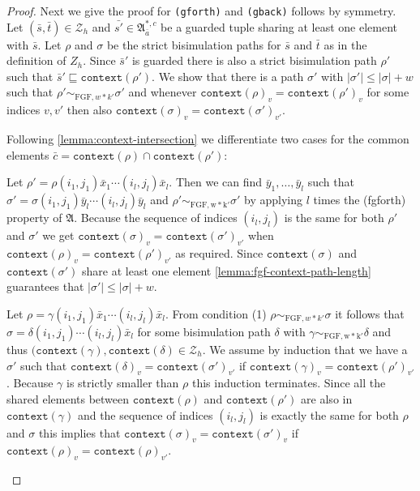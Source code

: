 \documentclass[draft]{scrartcl}
\theoremstyle{definition}
\newcommand{\context}[1]{\mathtt{context}(#1)}
\begin{document}
\begin{proof}
  Next we give the proof for \texttt{(gforth)} and \texttt{(gback)} follows by symmetry.
  Let $(\bar{s}, \bar{t}) \in \mathcal{Z}_{h}$ and $\bar{s'} \in \mathfrak{A}^{*,c}_{\bar{a}}$ be a guarded tuple sharing at least one element with $\bar{s}$.
  Let $\rho$ and $\sigma$ be the strict bisimulation paths for $\bar{s}$ and $\bar{t}$ as in the definition of $Z_{h}$.
  Since $\bar{s}'$ is guarded there is also a strict bisimulation path $\rho'$ such that $\bar{s}' \sqsubseteq \context{\rho'}$.
  We show that there is a path $\sigma'$ with $|\sigma'| \le |\sigma| + w$ such that $\rho' \sim_{\textrm{FGF}, w*k'} \sigma'$ and whenever $\context{\rho}_{v} = \context{\rho'}_{v}$ for some indices $v,v'$ then also $\context{\sigma}_{v} = \context{\sigma'}_{v'}$.

  Following \cref{lemma:context-intersection} we differentiate two cases for the common elements $\bar{c} = \context{\rho} \cap \context{\rho'}$:

  \begin{description}[left=0pt]
  \item[a) $\rho \le \rho'$ and $\bar{c}$ is a prefix of $\context{\rho'}$] Let $\rho' = \rho(i_{1}, j_{1})\bar{x}_{1} \cdots (i_{l}, j_{l})\bar{x}_{l}$.
  Then we can find $\bar{y}_{1},\ldots,\bar{y}_{l}$ such that $\sigma' = \sigma(i_{1}, j_{1})\bar{y}_{l}\cdots(i_{l},j_{l})\bar{y}_{l}$ and $\rho' \sim_{\mathrm{FGF,w*k'}} \sigma'$ by applying $l$ times the (fgforth) property of $\mathfrak{A}$.
  Because the sequence of indices $(i_{l},j_{l})$ is the same for both $\rho'$ and $\sigma'$ we get $\context{\sigma}_{v} = \context{\sigma'}_{v'}$ when $\context{\rho}_{v} = \context{\rho'}_{v'}$ as required.
  Since $\context{\sigma}$ and $\context{\sigma'}$ share at least one element \cref{lemma:fgf-context-path-length} guarantees that $|\sigma'| \le |\sigma| + w$.

  \item[b) exists path $\gamma < \rho$ with $\bar{c} \sqsubseteq \context{\gamma}$] Let $\rho = \gamma (i_{1}, j_{1})\bar{x}_{1}\cdots(i_{l}, j_{l})\bar{x}_{l}$.
  From condition (1) $\rho \sim_{\mathrm{FGF}, w*k'} \sigma$ it follows that $\sigma = \delta(i_{1}, j_{1})\cdots(i_{l}, j_{l})\bar{x}_{l}$ for some bisimulation path $\delta$ with $\gamma \sim_{\mathrm{FGF, w*k'}} \delta$ and thus $(\context{\gamma}, \context{\delta} \in \mathcal{Z}_{h}$.
  We assume by induction that we have a $\sigma'$ such that $\context{\delta}_{v} = \context{\sigma'}_{v'}$ if $\context{\gamma}_{v} = \context{\rho'}_{v'}$.
  Because $\gamma$ is strictly smaller than $\rho$ this induction terminates.
  Since all the shared elements between $\context{\rho}$ and $\context{\rho'}$ are also in $\context{\gamma}$ and the sequence of indices $(i_{l}, j_{l})$ is exactly the same for both $\rho$ and $\sigma$ this implies that $\context{\sigma}_{v} = \context{\sigma'}_{v}$ if $\context{\rho}_{v} = \context{\rho}_{v'}$.
  \end{description}


\end{proof}
\end{document}
